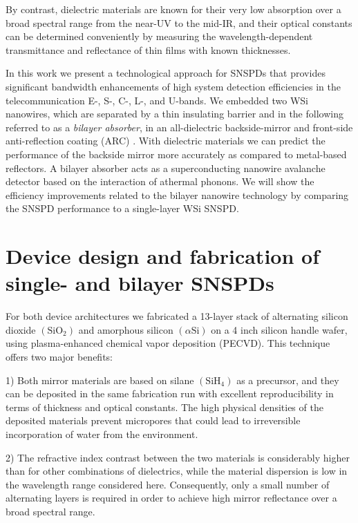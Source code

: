 \documentclass[aip,apl,showpacs,showkeys,preprint,superscriptaddress,preprintnumbers,amsmath,amssymb]{revtex4-1}
\begin{document}
\begin{bibunit}
By contrast, dielectric materials are known for their very low absorption over a broad spectral range from the near-UV to the mid-IR, and their optical constants can be determined conveniently by measuring the wavelength-dependent transmittance and reflectance of thin films with known thicknesses.

In this work we present a technological approach for SNSPDs that provides significant bandwidth enhancements of high system detection efficiencies in the telecommunication E-, S-, C-, L-,  and U-bands. We embedded two WSi nanowires, which are separated by a thin insulating barrier and in the following referred to as a \textit{bilayer absorber}, in an all-dielectric backside-mirror and front-side anti-reflection coating (ARC) \cite{Gaggero2010,Redaelli2016,Zhang2016a,Li2016,Yamashita2016}. With dielectric materials we can predict the performance of the backside mirror more accurately as compared to metal-based reflectors. A bilayer absorber acts as a superconducting nanowire avalanche detector based on the interaction of athermal phonons\cite{Verma2016}. We will show the efficiency improvements related to the bilayer nanowire technology by comparing the SNSPD performance to a single-layer WSi SNSPD.

\section{Device design and fabrication of single- and bilayer SNSPDs}


For both device architectures we fabricated a 13-layer stack of alternating silicon dioxide $\left(\mathrm{SiO}_2\right)$ and amorphous silicon $\left(\alpha\mathrm{Si}\right)$ on a 4 inch silicon handle wafer, using plasma-enhanced chemical vapor deposition (PECVD). This technique offers two major benefits:

1) Both mirror materials are based on silane $\left(\mathrm{SiH}_4\right)$ as a precursor, and they can be deposited in the same fabrication run with excellent reproducibility in terms of thickness and optical constants. The  high physical densities of the deposited materials prevent micropores that could lead to irreversible incorporation of water from the environment. 

2) The refractive index contrast between the two materials is considerably higher than for other combinations of dielectrics, while the material dispersion is low in the wavelength range considered here. Consequently, only a small number of alternating layers is required in order to achieve high mirror reflectance over a broad spectral range.


\end{bibunit}
\end{document}
